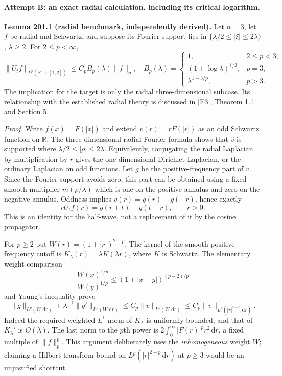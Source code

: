 \documentclass[11pt]{article}
\newcommand{\R}{\mathbb{R}}
\newcommand{\dd}{\,\mathrm d}
\newcommand{\eref}[2]{\hyperlink{extra:#1:#2}{[E#2]}}
\begin{document}
	\paragraph{Attempt B: an exact radial calculation, including its critical logarithm.}
	\textbf{Lemma 201.1 (radial benchmark, independently derived).}
	Let $n=3$, let $f$ be radial and Schwartz, and suppose its Fourier support
	lies in $\{\lambda/2\leq|\xi|\leq2\lambda\}$, $\lambda\geq2$.
	For $2\leq p<\infty$,
	\begin{equation}\label{ra201:radialbound}
		\|U_tf\|_{L^p(\R^3\times[1,2])}
		\leq C_p B_p(\lambda)\|f\|_p,
		\quad
		B_p(\lambda)=
		\begin{cases}
			1,&2\leq p<3,\\
			(1+\log\lambda)^{1/3},&p=3,\\
			\lambda^{1-3/p},&p>3.
		\end{cases}
	\end{equation}
	The implication for the target is only the radial three-dimensional
	subcase. Its relationship with the established radial theory is discussed
	in \eref{201}{3}, Theorem 1.1 and Section 5.
	
	\emph{Proof.}
	Write $f(x)=F(|x|)$ and extend $v(r)=rF(|r|)$ as an odd Schwartz
	function on $\R$. The three-dimensional radial Fourier formula shows
	that $\widehat v$ is supported where
	$\lambda/2\leq|\rho|\leq2\lambda$. Equivalently, conjugating the radial
	Laplacian by multiplication by $r$ gives the one-dimensional Dirichlet
	Laplacian, or the ordinary Laplacian on odd functions. Let $g$ be the
	positive-frequency part of $v$. Since the Fourier support avoids zero,
	this part can be obtained using a fixed smooth multiplier
	$m(\rho/\lambda)$ which is one on the positive annulus and zero on the
	negative annulus. Oddness implies $v(r)=g(r)-g(-r)$, hence exactly
	\begin{equation}\label{ra201:radialidentity}
		rU_tf(r)=g(r+t)-g(t-r),\qquad r>0.
	\end{equation}
	This is an identity for the half-wave, not a replacement of it by the
	cosine propagator.
	
	For $p\geq2$ put $W(r)=(1+|r|)^{2-p}$. The kernel of the smooth
	positive-frequency cutoff is $K_\lambda(r)=\lambda K(\lambda r)$,
	where $K$ is Schwartz. The elementary weight comparison
	\[
	\frac{W(x)^{1/p}}{W(y)^{1/p}}
	\leq (1+|x-y|)^{(p-2)/p}
	\]
	and Young's inequality prove
	\begin{equation}\label{ra201:weightedcutoff}
		\|g\|_{L^p(W\,\dd r)}+
		\lambda^{-1}\|g'\|_{L^p(W\,\dd r)}
		\leq C_p\|v\|_{L^p(W\,\dd r)}
		\leq C_p\|v\|_{L^p(|r|^{2-p}\,\dd r)}.
	\end{equation}
	Indeed the required weighted $L^1$ norm of $K_\lambda$ is uniformly
	bounded, and that of $K_\lambda'$ is $O(\lambda)$.
	The last norm to the $p$th power is
	$2\int_0^\infty |F(r)|^p r^2\dd r$, a fixed multiple of $\|f\|_p^p$.
	This argument deliberately uses the \emph{inhomogeneous} weight $W$;
	claiming a Hilbert-transform bound on $L^p(|r|^{2-p}\dd r)$ at $p\geq3$
	would be an unjustified shortcut.
	
\end{document}
